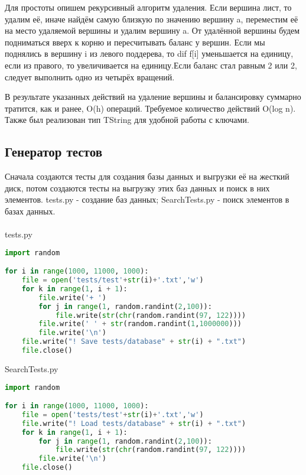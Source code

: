 \documentclass[12pt]{article}
\begin{document}
Для простоты опишем рекурсивный алгоритм удаления. Если вершина лист, то удалим её, иначе найдём самую близкую по значению вершину a, переместим её на место удаляемой вершины и удалим вершину a. От удалённой вершины будем подниматься вверх к корню и пересчитывать баланс у вершин. Если мы поднялись в вершину i из левого поддерева, то dif f[i] уменьшается на единицу, если из правого, то увеличивается на единицу.Если баланс стал равным 2 или 2, следует выполнить одно из четырёх вращений.

В результате указанных действий на удаление вершины и балансировку суммарно тратится, как и ранее, O(h) операций. Требуемое количество действий O(log n).
Также был реализован тип TString для удобной работы с ключами.

\subsection*{Генератор тестов}
Сначала создаются тесты для создания базы данных и выгрузки её на жесткий диск, потом создаются тесты на выгрузку этих баз данных и поиск в них элементов. tests.py - создание баз данных; SearchTests.py - поиск элементов в базах данных. \\\\
tests.py\\
\begin{lstlisting}[language=python]
import random

for i in range(1000, 11000, 1000):
    file = open('tests/test'+str(i)+'.txt','w')
    for k in range(1, i + 1):
        file.write('+ ')
        for j in range(1, random.randint(2,100)):
            file.write(str(chr(random.randint(97, 122))))
        file.write(' ' + str(random.randint(1,1000000)))
        file.write('\n')
    file.write("! Save tests/database" + str(i) + ".txt")
    file.close()
\end{lstlisting}

SearchTests.py\\
\begin{lstlisting}[language=python]
import random

for i in range(1000, 11000, 1000):
    file = open('tests/test'+str(i)+'.txt','w')
    file.write("! Load tests/database" + str(i) + ".txt")
    for k in range(1, i + 1):
        for j in range(1, random.randint(2,100)):
            file.write(str(chr(random.randint(97, 122))))
        file.write('\n')
    file.close()
\end{lstlisting}
\\\\
\end{document}
